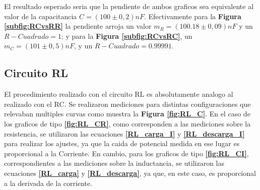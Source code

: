 \documentclass[11pt,a4paper]{article}
\begin{document}
El resultado esperado seria que la pendiente de ambos graficos sea equivalente al valor de la capacitancia $C = (100 \pm 0,2)nF$. Efectivamente para la \textbf{Figura \ref{subfig:RCvsRR}} la pendiente arroja un valor $m_{R} = (100.18 \pm 0,09)nF$ y un $R-Cuadrado = 1$; y para la \textbf{Figura \ref{subfig:RCvsRC}}, un $m_{C} = (101 \pm 0,5)nF$, y un $R-Cuadrado = 0.99991$. 

\subsection{Circuito RL}

El procedimiento realizado con el circuito RL es absolutamente analogo al realizado con el RC. Se realizaron mediciones para distintas configuraciones que relevaban multiples curvas como muestra la \textbf{Figura \ref{fig:RL_C}}. En el caso de los graficos de tipo \textbf{\ref{fig:RL_CR}}, como corresponden a las mediciones sobre la resistencia, se utilizaron las ecuaciones \textbf{\ref{RL_carga_I}} y \textbf{\ref{RL_descarga_I}} para realizar los ajustes, ya que la caida de potencial medida en ese lugar es proporcional a la Corriente. En cambio, para los graficos de tipo \textbf{\ref{fig:RL_CI}}, correspondientes a las mediciones sobre la inductancia, se utilizaron las ecuaciones \textbf{\ref{RL_carga}} y \textbf{\ref{RL_descarga}}, ya que, en este caso, es proporcional a la derivada de la corriente.
\end{document}
